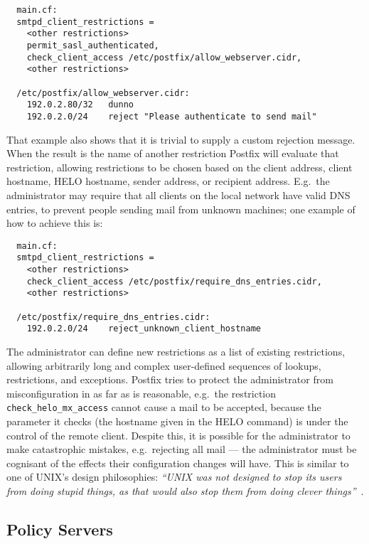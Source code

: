 \begin{verbatim}
  main.cf:
  smtpd_client_restrictions =
    <other restrictions>
    permit_sasl_authenticated,
    check_client_access /etc/postfix/allow_webserver.cidr,
    <other restrictions>

  /etc/postfix/allow_webserver.cidr:
    192.0.2.80/32   dunno
    192.0.2.0/24    reject "Please authenticate to send mail"
\end{verbatim}

That example also shows that it is trivial to supply a custom rejection
message.  When the result is the name of another restriction Postfix will
evaluate that restriction, allowing restrictions to be chosen based on the
client  address, client hostname, HELO hostname, sender
address, or recipient address.  E.g.\ the administrator may require that
all clients on the local network have valid DNS entries, to prevent people
sending mail from unknown machines; one example of how to achieve this is:

\begin{verbatim}
  main.cf:
  smtpd_client_restrictions =
    <other restrictions>
    check_client_access /etc/postfix/require_dns_entries.cidr,
    <other restrictions>

  /etc/postfix/require_dns_entries.cidr:
    192.0.2.0/24    reject_unknown_client_hostname
\end{verbatim}

The administrator can define new restrictions as a list of existing
restrictions, allowing arbitrarily long and complex user-defined sequences
of lookups, restrictions, and exceptions.  Postfix tries to protect the
administrator from misconfiguration in as far as is reasonable, e.g.\ the
restriction \texttt{check\_helo\_mx\_access} cannot cause a mail to be
accepted, because the parameter it checks (the hostname given in the HELO
command) is under the control of the remote client.  Despite this, it is
possible for the administrator to make catastrophic mistakes, e.g.\
rejecting all mail --- the administrator must be cognisant of the effects
their configuration changes will have.  This is similar to one of UNIX's
design philosophies: \textit{``UNIX was not designed to stop its users from
doing stupid things, as that would also stop them from doing clever
things''\/}~\cite{unix-philosophy}.

\subsection{Policy Servers}

